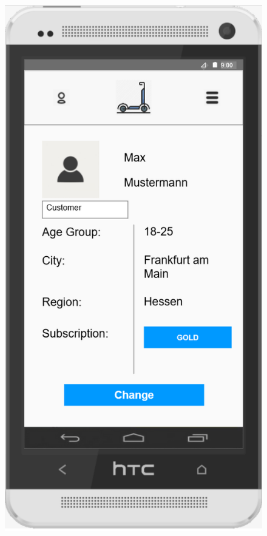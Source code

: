 \documentclass[a4paper, 12pt]{article}
\begin{document}
\begin{figure} [htbp]
    \begin{center}
        \begin{minipage}{0.45\textwidth}
            \begin{center}
                \includegraphics[scale=0.65]{images/prototypes/02-01-menu-dropdown--account-management.png}

\end{center}
\end{minipage}
\end{center}
\end{figure}
\end{document}

